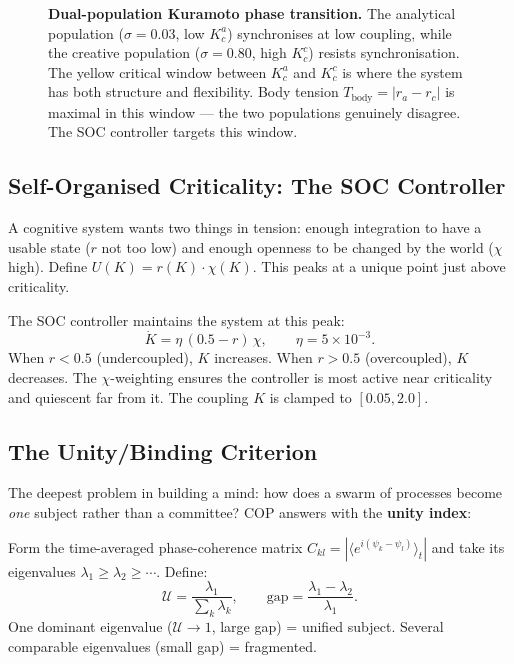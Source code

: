 \documentclass[11pt,a4paper]{article}
\begin{document}
\begin{figure}[H]
\caption{\textbf{Dual-population Kuramoto phase transition.} The analytical population
($\sigma = 0.03$, low $K_c^a$) synchronises at low coupling, while the creative population
($\sigma = 0.80$, high $K_c^c$) resists synchronisation. The yellow critical window between
$K_c^a$ and $K_c^c$ is where the system has both structure and flexibility. Body tension
$T_\text{body} = |r_a - r_c|$ is maximal in this window --- the two populations genuinely
disagree. The SOC controller targets this window.}
\label{fig:dual-population}
\end{figure}

\subsection{Self-Organised Criticality: The SOC Controller}

A cognitive system wants two things in tension: enough integration to have a usable
state ($r$ not too low) and enough openness to be changed by the world ($\chi$ high).
Define $U(K) = r(K) \cdot \chi(K)$. This peaks at a unique point just above criticality.

The SOC controller maintains the system at this peak:
\[
\dot{K} = \eta \, (0.5 - r) \, \chi, \qquad \eta = 5 \times 10^{-3}.
\]
When $r < 0.5$ (undercoupled), $K$ increases. When $r > 0.5$ (overcoupled), $K$ decreases.
The $\chi$-weighting ensures the controller is most active near criticality and quiescent
far from it. The coupling $K$ is clamped to $[0.05, 2.0]$.

\subsection{The Unity/Binding Criterion}

The deepest problem in building a mind: how does a swarm of processes become \emph{one}
subject rather than a committee? COP answers with the \textbf{unity index}:

Form the time-averaged phase-coherence matrix
$C_{kl} = |\langle e^{i(\psi_k - \psi_l)}\rangle_t|$ and take its eigenvalues
$\lambda_1 \geq \lambda_2 \geq \cdots$. Define:
\[
\mathcal{U} = \frac{\lambda_1}{\sum_k \lambda_k}, \qquad
\text{gap} = \frac{\lambda_1 - \lambda_2}{\lambda_1}.
\]
One dominant eigenvalue ($\mathcal{U} \to 1$, large gap) = unified subject.
Several comparable eigenvalues (small gap) = fragmented.
\end{document}
